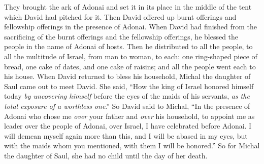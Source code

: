 \begin{biblechapter}
\verse They brought the ark of Adonai and set it in its place in the middle of the tent which David had pitched for it. Then David offered up burnt offerings and fellowship offerings in the presence of Adonai.
\verse When David had finished from the sacrificing of the burnt offerings and the fellowship offerings, he blessed the people in the name of Adonai of hosts.
\verse Then he distributed to all the people, to all the multitude of Israel, from man to woman, to each: one ring-shaped piece of bread, one cake of dates, and one cake of raisins; and all the people went each to his house.
\verse When David returned to bless his household, Michal the daughter of Saul came out to meet David. She said, “How the king of Israel honored himself today \textit{by uncovering himself} before the eyes of the maids of his servants, \textit{as the total exposure of a worthless one}.”
\verse So David said to Michal, “In the presence of Adonai who chose me \textit{over} your father and \textit{over} his household, to appoint me as leader over the people of Adonai, over Israel, I have celebrated before Adonai.
\verse I will demean myself again more than this, and I will be abased in my eyes, but with the maids whom you mentioned, with them I will be honored.”
\verse So for Michal the daughter of Saul, she had no child until the day of her death.
\end{biblechapter}

